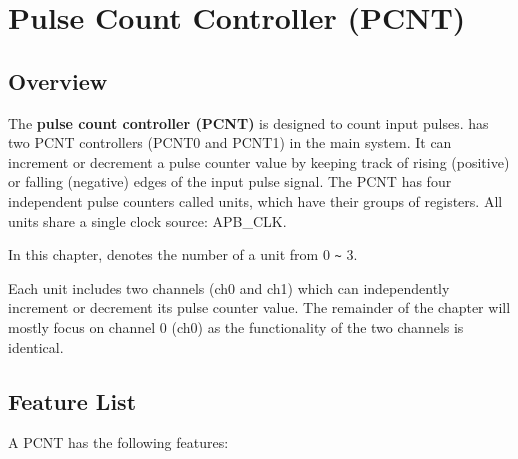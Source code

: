 \documentclass[main\_\_EN.tex]{subfiles}
\begin{document}

\ifglobal
\else
    \listoftodos
    {\let\clearpage\relax \listofdonetodos}
    \tableofcontents
\fi











\hypertarget{pcnt}{}
\chapter{Pulse Count Controller (PCNT)}
\label{mod:pcnt}

\section{Overview}
\label{sec:pcnt-overview}


The \textbf{pulse count controller (PCNT)} is designed to count input pulses. \chipname{} has two PCNT controllers (PCNT0 and PCNT1) in the main system. It can increment or decrement a pulse counter value by keeping track of rising (positive) or falling (negative) edges of the input pulse signal. The PCNT has four independent pulse counters called units, which have their groups of registers. All units share a single clock source: APB\_CLK.

In this chapter,  denotes the number of a unit from 0 \verb+~+ 3.

Each unit includes two channels (ch0 and ch1) which can independently increment or decrement its pulse counter value. The remainder of the chapter will mostly focus on channel 0 (ch0) as the functionality of the two channels is identical.

\section{Feature List}\label{sec:pcnt-features}
A PCNT has the following features:
\end{document}
